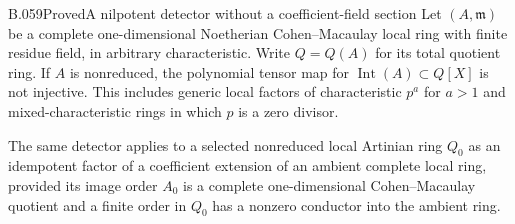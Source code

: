 \begin{saresult}{B.059}{Proved}{A nilpotent detector without a coefficient-field section}
Let $(A,\mathfrak m)$ be a complete one-dimensional
Noetherian Cohen--Macaulay local ring with finite
residue field, in arbitrary characteristic. Write
$Q=Q(A)$ for its total quotient ring. If $A$ is
nonreduced, the polynomial tensor map for
$\operatorname{Int}(A)\subset Q[X]$ is not injective.
This includes generic local factors of characteristic
$p^a$ for $a>1$ and mixed-characteristic rings in
which $p$ is a zero divisor.

The same detector applies to a selected nonreduced
local Artinian ring $Q_0$ as an idempotent factor
of a coefficient extension of an ambient complete local
ring, provided
its image order $A_0$ is a complete one-dimensional
Cohen--Macaulay quotient and a finite order in $Q_0$
has a nonzero conductor into the ambient ring.
\end{saresult}
